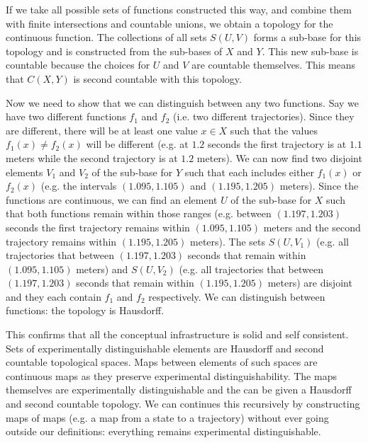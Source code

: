 \documentclass[11pt,letterpaper,fleqn]{memoir} %
\begin{document}
If we take all possible sets of functions constructed this way, and combine them with finite intersections and countable unions, we obtain a topology for the continuous function. The collections of all sets $S(U,V)$ forms a sub-base for this topology and is constructed from the sub-bases of $X$ and $Y$. This new sub-base is countable because the choices for $U$ and $V$ are countable themselves. This means that $C(X,Y)$ is second countable with this topology.

Now we need to show that we can distinguish between any two functions. Say we have two different functions $f_1$ and $f_2$ (i.e. two different trajectories). Since they are different, there will be at least one value $x \in X$ such that the values $f_1(x)\neq f_2(x)$ will be different (e.g. at $1.2$ seconds the first trajectory is at $1.1$ meters while the second trajectory is at $1.2$ meters). We can now find two disjoint elements $V_1$ and $V_2$ of the sub-base for $Y$ such that each includes either $f_1(x)$ or $f_2(x)$ (e.g. the intervals $(1.095, 1.105)$ and $(1.195, 1.205)$ meters). Since the functions are continuous, we can find an element $U$ of the sub-base for $X$ such that both functions remain within those ranges (e.g. between $(1.197, 1.203)$ seconds the first trajectory remains within $(1.095, 1.105)$ meters and the second trajectory remains within $(1.195, 1.205)$ meters). The sets $S(U, V_1)$ (e.g. all trajectories that between $(1.197, 1.203)$ seconds that remain within $(1.095, 1.105)$ meters) and $S(U, V_2)$ (e.g. all trajectories that between $(1.197, 1.203)$ seconds that remain within $(1.195, 1.205)$ meters) are disjoint and they each contain $f_1$ and $f_2$ respectively. We can distinguish between functions: the topology is Hausdorff.

This confirms that all the conceptual infrastructure is solid and self consistent. Sets of experimentally distinguishable elements are Hausdorff and second countable topological spaces. Maps between elements of such spaces are continuous maps as they preserve experimental distinguishability. The maps themselves are experimentally distinguishable and the can be given a Hausdorff and second countable topology. We can continues this recursively by constructing maps of maps (e.g. a map from a state to a trajectory) without ever going outside our definitions: everything remains experimental distinguishable.
\end{document}
